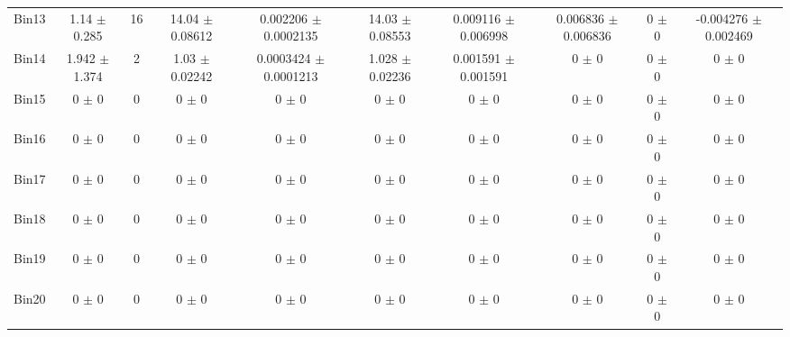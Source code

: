 \begin{tabular}{@{\extracolsep{4pt}}lccccccccc@{}}
     Bin13 & 1.14 $\pm$ 0.285 & 16 & 14.04 $\pm$ 0.08612 & 0.002206 $\pm$ 0.0002135 & 14.03 $\pm$ 0.08553 & 0.009116 $\pm$ 0.006998 & 0.006836 $\pm$ 0.006836 & 0 $\pm$ 0 & -0.004276 $\pm$ 0.002469 \\ 
     Bin14 & 1.942 $\pm$ 1.374 & 2 & 1.03 $\pm$ 0.02242 & 0.0003424 $\pm$ 0.0001213 & 1.028 $\pm$ 0.02236 & 0.001591 $\pm$ 0.001591 & 0 $\pm$ 0 & 0 $\pm$ 0 & 0 $\pm$ 0 \\ 
     Bin15 & 0 $\pm$ 0 & 0 & 0 $\pm$ 0 & 0 $\pm$ 0 & 0 $\pm$ 0 & 0 $\pm$ 0 & 0 $\pm$ 0 & 0 $\pm$ 0 & 0 $\pm$ 0 \\ 
     Bin16 & 0 $\pm$ 0 & 0 & 0 $\pm$ 0 & 0 $\pm$ 0 & 0 $\pm$ 0 & 0 $\pm$ 0 & 0 $\pm$ 0 & 0 $\pm$ 0 & 0 $\pm$ 0 \\ 
     Bin17 & 0 $\pm$ 0 & 0 & 0 $\pm$ 0 & 0 $\pm$ 0 & 0 $\pm$ 0 & 0 $\pm$ 0 & 0 $\pm$ 0 & 0 $\pm$ 0 & 0 $\pm$ 0 \\ 
     Bin18 & 0 $\pm$ 0 & 0 & 0 $\pm$ 0 & 0 $\pm$ 0 & 0 $\pm$ 0 & 0 $\pm$ 0 & 0 $\pm$ 0 & 0 $\pm$ 0 & 0 $\pm$ 0 \\ 
     Bin19 & 0 $\pm$ 0 & 0 & 0 $\pm$ 0 & 0 $\pm$ 0 & 0 $\pm$ 0 & 0 $\pm$ 0 & 0 $\pm$ 0 & 0 $\pm$ 0 & 0 $\pm$ 0 \\ 
     Bin20 & 0 $\pm$ 0 & 0 & 0 $\pm$ 0 & 0 $\pm$ 0 & 0 $\pm$ 0 & 0 $\pm$ 0 & 0 $\pm$ 0 & 0 $\pm$ 0 & 0 $\pm$ 0 \\ 
\hline\hline
  \end{tabular}
